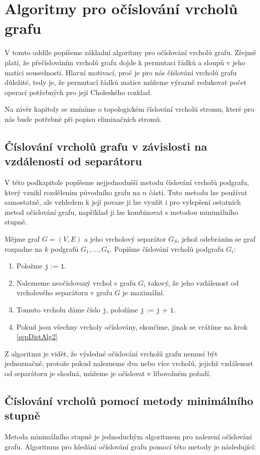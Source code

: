 \documentclass[11pt,american,czech,oneside]{book}
\theoremstyle{plain}
\theoremstyle{definition}
\begin{document}
\section{Algoritmy pro očíslování vrcholů grafu}
V tomto oddíle popíšeme základní algoritmy pro očíslování vrcholů grafu. Zřejmě platí, že přečíslováním vrcholů grafu dojde k permutaci řádků a sloupů v jeho matici sousednosti. Hlavní motivací, proč je pro nás číslování vrcholů grafu důležité, tedy je, že permutací řádků matice můžeme výrazně redukovat počet operací potřebných pro její Choleského rozklad.

Na závěr kapitoly se zmíníme o topologickém číslování vrcholů stromu, které pro nás bude potřebné při popisu eliminačních stromů.

\subsection{Číslování vrcholů grafu v závislosti na vzdálenosti od separátoru}
\label{sepDistOrdering}

V této podkapitole popíšeme nejjednodušší metodu číslování vrcholů podgrafu, který vznikl rozdělením původního grafu na $n$ částí.
Tuto metodu lze používat samostatně, ale vzhledem k její povaze ji lze využít i pro vylepšení ostatních metod očíslování grafu,
například ji lze kombinovat s metodou minimálního stupně.

Mějme graf $G = (V,E)$ a jeho vrcholový separátor $G_S$, jehož odebráním se graf rozpadne na $k$ podgrafů $G_1, \ldots, G_k$.
Popišme číslování vrcholů podgrafu $G_i$:

\begin{enumerate}
  \item Položme $\texttt{j := 1}$.
  \item \label{sepDistAlg2} Nalezneme neočíslovaný vrchol $v$ grafu $G_i$ takový, že jeho vzdálenost od vrcholového separátoru v grafu $G$ je maximální.
  \item Tomuto vrcholu dáme číslo $\texttt{j}$, položíme $\texttt{j := j + 1}$.
  \item Pokud jsou všechny vrcholy očíslovány, skončíme, jinak se vrátíme na krok \ref{sepDistAlg2}
\end{enumerate}

Z algoritmu je vidět, že výsledné očíslování vrcholů grafu nemusí být jednoznačné, protože pokud nalezneme dva nebo více vrcholů, jejichž vzdálenost od separátoru je shodná, můžeme je očíslovat v libovolném pořadí.

\subsection{Číslování vrcholů pomocí metody minimálního stupně}
\label{MDordering}
Metoda minimálního stupně je jednoduchým algoritmem pro nalezení očíslování grafu. Algoritmus pro hledání očíslování grafu pomocí této metody je následující:
\end{document}
